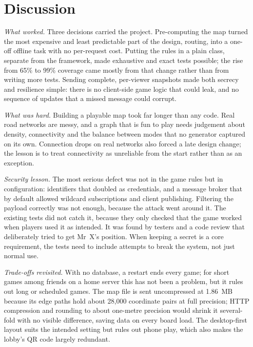 \documentclass[lettersize,journal]{IEEEtran}
\begin{document}
\section{Discussion}\label{sec:discussion}

\emph{What worked.} Three decisions carried the project. Pre-computing the map turned the most expensive and least predictable part of the design, routing, into a one-off offline task with no per-request cost. Putting the rules in a plain class, separate from the framework, made exhaustive and exact tests possible; the rise from 65\% to 99\% coverage came mostly from that change rather than from writing more tests. Sending complete, per-viewer snapshots made both secrecy and resilience simple: there is no client-side game logic that could leak, and no sequence of updates that a missed message could corrupt.

\emph{What was hard.} Building a playable map took far longer than any code. Real road networks are messy, and a graph that is fun to play needs judgement about density, connectivity and the balance between modes that no generator captured on its own. Connection drops on real networks also forced a late design change; the lesson is to treat connectivity as unreliable from the start rather than as an exception.

\emph{Security lesson.} The most serious defect was not in the game rules but in configuration: identifiers that doubled as credentials, and a message broker that by default allowed wildcard subscriptions and client publishing. Filtering the payload correctly was not enough, because the attack went around it. The existing tests did not catch it, because they only checked that the game worked when players used it as intended. It was found by testers and a code review that deliberately tried to get Mr~X's position. When keeping a secret is a core requirement, the tests need to include attempts to break the system, not just normal use.

\emph{Trade-offs revisited.} With no database, a restart ends every game; for short games among friends on a home server this has not been a problem, but it rules out long or scheduled games. The map file is sent uncompressed at 1.86~MB because its edge paths hold about 28,000 coordinate pairs at full precision; HTTP compression and rounding to about one-metre precision would shrink it several-fold with no visible difference, saving data on every board load. The desktop-first layout suits the intended setting but rules out phone play, which also makes the lobby's QR code largely redundant.
\end{document}
